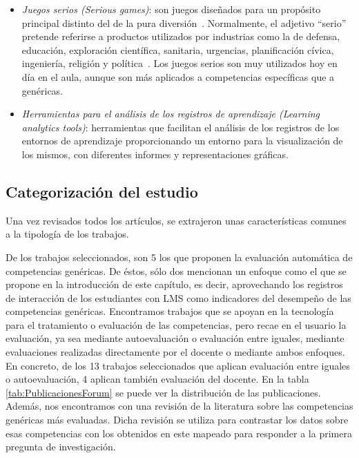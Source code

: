 \begin{itemize}
\item \emph{Juegos serios (Serious games)}: son juegos diseñados para un propósito principal distinto del de la pura diversión~\cite{djaouti2011classifying}. Normalmente, el adjetivo ``serio'' pretende referirse a productos utilizados por industrias como la de defensa, educación, exploración científica, sanitaria, urgencias, planificación cívica, ingeniería, religión y política~\cite{balta2016coddii}. Los juegos serios son muy utilizados hoy en día en el aula, aunque son más aplicados a competencias específicas que a genéricas. 
\item \emph{Herramientas para el análisis de los registros de aprendizaje (Learning analytics tools)}: herramientas que facilitan el análisis de los registros de los entornos de aprendizaje proporcionando un entorno para la visualización de los mismos, con diferentes informes y representaciones gráficas.
\end{itemize}



\subsection{Categorización del estudio}

Una vez revisados todos los artículos, se extrajeron unas características comunes a la tipología de los trabajos. 

De los trabajos seleccionados, son 5 los que proponen la evaluación automática de competencias genéricas. De éstos, sólo dos mencionan un enfoque como el que se propone en la introducción de este capítulo, es decir, aprovechando los registros de interacción de los estudiantes con LMS como indicadores del desempeño de las competencias genéricas. Encontramos trabajos que se apoyan en la tecnología para el tratamiento o evaluación de las competencias, pero recae en el usuario la evaluación, ya sea mediante autoevaluación o evaluación entre iguales, mediante evaluaciones realizadas directamente por el docente o mediante ambos enfoques. En concreto, de los 13 trabajos seleccionados que aplican evaluación entre iguales o autoevaluación, 4 aplican también evaluación del docente. En la tabla \ref{tab:PublicacionesForum} se puede ver la distribución de las publicaciones. Además, nos encontramos con una revisión de la literatura sobre las competencias genéricas más evaluadas. Dicha revisión se utiliza para contrastar los datos sobre esas competencias con los obtenidos en este mapeado para responder a la primera pregunta de investigación. %

